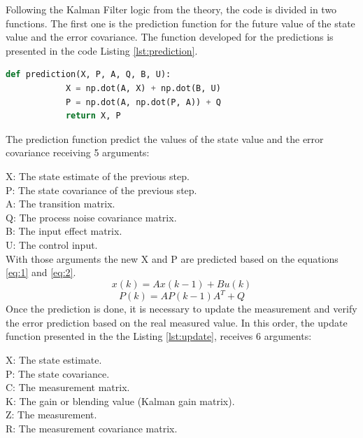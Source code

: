 \documentclass{article}
\begin{document}
    Following the Kalman Filter logic from the theory, the code is divided in two functions. The first one is the  prediction function for the
    future value of the state value and the error covariance. The function developed for the predictions is presented in the code Listing \ref{lst:prediction}.

    \begin{lstlisting}[language=Python, caption= Prediction Kalman function, label={lst:prediction}]
        def prediction(X, P, A, Q, B, U):
            X = np.dot(A, X) + np.dot(B, U) 
            P = np.dot(A, np.dot(P, A)) + Q 
            return X, P    
    \end{lstlisting}


    The prediction function predict the values of the state value and the error covariance receiving 5 arguments:

    X: The state estimate of the previous step. \\
    P: The state covariance of the previous step. \\
    A: The transition matrix. \\
    Q: The process noise covariance matrix. \\
    B: The input effect matrix. \\
    U: The control input. \\

    With those arguments the new X and P are predicted based on the equations \ref{eq:1} and  \ref{eq:2}.
    \begin{equation} \label{eq:1}
        x(k) = Ax(k - 1) + Bu(k)         
    \end{equation}
    \begin{equation} \label{eq:2}
        P(k) = AP(k - 1)A^T + Q 
    \end{equation}
    Once the prediction is done, it is necessary to update the measurement and verify the error prediction based on the real measured value.
    In this order, the update function presented in the the Listing \ref{lst:update}, receives 6 arguments:

    X: The state estimate. \\
    P: The state covariance. \\
    C: The measurement matrix. \\
    K: The gain or blending value (Kalman gain matrix).\\
    Z: The measurement. \\
    R: The measurement covariance matrix. \\
\end{document}
